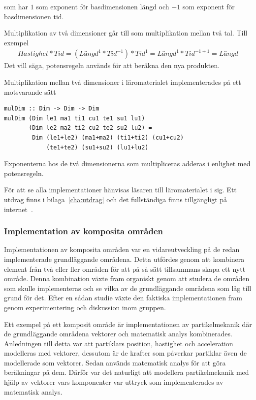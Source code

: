som har $1$ som exponent för basdimensionen längd och $-1$ som exponent för
basdimensionen tid.

Multiplikation av två dimensioner går till som multiplikation mellan två tal.
Till exempel \begin{align*}
  Hastighet * Tid = (Längd^1 * Tid^{-1}) * Tid^1 = Längd^1 * Tid^{-1 + 1} =
  Längd \end{align*}
Det vill säga, potensregeln används för att beräkna den nya produkten.

Multiplikation mellan två dimensioner i läromaterialet implementerades på ett
motsvarande sätt

\begin{lstlisting}[frame=none, belowskip=-0.5\baselineskip, xleftmargin=0.5in]
mulDim :: Dim -> Dim -> Dim
mulDim (Dim le1 ma1 ti1 cu1 te1 su1 lu1) 
       (Dim le2 ma2 ti2 cu2 te2 su2 lu2) =
        Dim (le1+le2) (ma1+ma2) (ti1+ti2) (cu1+cu2) 
            (te1+te2) (su1+su2) (lu1+lu2)
\end{lstlisting}

Exponenterna hos de två dimensionerna som multipliceras adderas i enlighet med
potensregeln.

För att se alla implementationer hänvisas läsaren till läromaterialet i sig. Ett
utdrag finns i bilaga~\ref{cha:utdrag} och det fullständiga finns tillgängligt
på internet~\cite{LYAP}.

\subsubsection*{Implementation av komposita områden}

Implementationen av komposita områden var en vidareutveckling på de redan
implementerade grundläggande områdena. Detta utfördes genom att kombinera
element från två eller fler områden för att på så sätt tillsammans skapa ett nytt område. Denna kombination växte fram organiskt genom att studera de
områden som skulle implementeras och se vilka av de grundläggande områdena som
låg till grund för det. Efter en sådan studie växte den faktiska implementationen fram
genom experimentering och diskussion inom gruppen.

Ett exempel på ett komposit område är implementationen av partikelmekanik
där de grundläggande områdena vektorer och matematisk analys
kombinerades. Anledningen till detta var att partiklars position, hastighet och
acceleration modelleras med vektorer, dessutom är de krafter som påverkar
partiklar även de modellerade som vektorer. Sedan används matematisk analys för att
göra beräkningar på dem. Därför var det naturligt att modellera partikelmekanik
med hjälp av vektorer vars komponenter var uttryck som
implementerades av matematisk analys.

